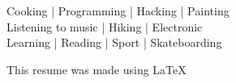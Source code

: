 \documentclass[a4paper,10pt]{article}
\begin{document}
\begin{adjustbox}{valign=t}
\begin{minipage}{0.6\textwidth}
\begin{multicols}{2}
\begin{spacing}{0.9}
Cooking | Programming | Hacking | Painting\\
Listening to music | Hiking | Electronic\\
Learning | Reading | Sport | Skateboarding
\end{spacing}

\vfill\null  %

\end{multicols}
\vspace{-1\baselineskip}

\LastUpdate

\vfill
\begin{flushright}
    This resume was made using \LaTeX
\end{flushright}
\end{minipage}
\end{adjustbox}
\newpage
\end{document}
